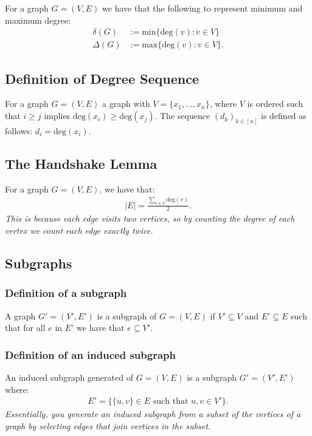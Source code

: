 \documentclass[a4paper, 12pt, twoside]{article}
\begin{document}
For a graph $G = (V, E)$ we have that the following to represent
minimum and maximum degree: \begin{align*}
  \delta(G) &:= \text{min}\{\text{deg}(v) : v \in V\} \\
  \Delta(G) &:= \text{max}\{\text{deg}(v) : v \in V\}.
\end{align*}

\subsection{Definition of Degree Sequence}

For a graph $G = (V, E)$ a graph with $V = \{x_1, \ldots, x_n\}$,
where $V$ is ordered such that $i \geq j$ implies $\text{deg}(x_i)
\geq \text{deg}(x_j)$. The sequence $(d_k)_{k \in [n]}$ is defined
as follows: $d_i = \text{deg}(x_i).$

\subsection{The Handshake Lemma}

For a graph $G = (V, E)$, we have that: \begin{gather*}
  |E| = \frac{\sum_{v \in V} \text{deg}(v)}{2}.
\end{gather*} \textit{This is because each edge visits two vertices,
so by counting the degree of each vertex we count each edge exactly
twice.}

\subsection{Subgraphs}

\subsubsection{Definition of a subgraph}

A graph $G' = (V', E')$ is a subgraph of $G = (V, E)$ if
$V' \subseteq V$ and $E' \subseteq E$ such that for all $e$
in $E'$ we have that $e \subseteq V'$.

\subsubsection{Definition of an induced subgraph}

An induced subgraph generated of $G = (V, E)$
is a subgraph $G' = (V', E')$ where: \begin{gather*} 
  E' = \{\{u, v\} \in E \text{ such that } u, v \in V'\}.
\end{gather*} \textit{Essentially, you generate an induced
subgraph from a subset of the vertices of a graph by selecting
edges that join vertices in the subset.}
\end{document}

